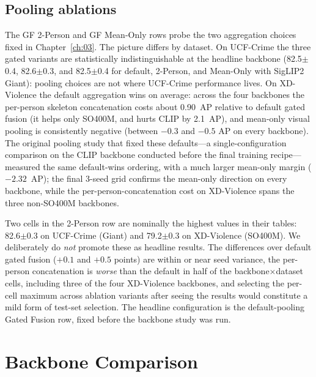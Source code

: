\subsection{Pooling ablations}
\label{sec:pooling}

The GF 2-Person and GF Mean-Only rows probe the two aggregation choices fixed
in Chapter~\ref{ch:03}. The picture differs by dataset. On UCF-Crime the three
gated variants are statistically indistinguishable at the headline backbone
(82.5$\pm$0.4, 82.6$\pm$0.3, and 82.5$\pm$0.4 for default, 2-Person, and
Mean-Only with SigLIP2 Giant): pooling choices are not where UCF-Crime
performance lives. On XD-Violence the default aggregation wins on average:
across the four backbones the per-person skeleton concatenation costs about
0.90~AP relative to default gated fusion (it helps only SO400M, and hurts
CLIP by 2.1~AP), and mean-only visual pooling is consistently negative
(between $-0.3$ and $-0.5$ AP on every backbone). The original pooling study
that fixed these defaults---a single-configuration comparison on the CLIP
backbone conducted before the final training recipe---measured the same
default-wins ordering, with a much larger mean-only margin ($-2.32$~AP); the
final 3-seed grid confirms the mean-only direction on every backbone, while
the per-person-concatenation cost on XD-Violence spans the three non-SO400M
backbones.

Two cells in the 2-Person row are nominally the highest values in their
tables: 82.6$\pm$0.3 on UCF-Crime (Giant) and 79.2$\pm$0.3 on XD-Violence
(SO400M). We deliberately do \emph{not} promote these as headline results.
The differences over default gated fusion ($+0.1$ and $+0.5$ points) are
within or near seed variance, the per-person concatenation is \emph{worse} than
the default in half of the backbone$\times$dataset cells, including three of
the four XD-Violence backbones, and selecting
the per-cell maximum across ablation variants after seeing the results would
constitute a mild form of test-set selection. The headline configuration is
the default-pooling Gated Fusion row, fixed before the backbone study was
run.

\section{Backbone Comparison}
\label{sec:backbones}

